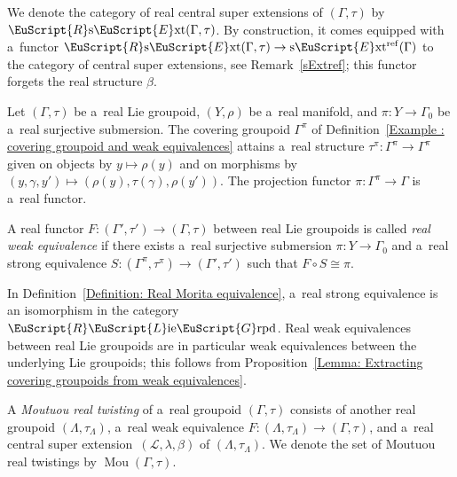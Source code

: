 \documentclass[pdftex]{sigma}
\numberwithin{equation}{section}
\def\mathscr#1{\EuScript{#1}}
\def\liegrpd{\mathscr{L}\text{ie}\mathscr{G}\text{rpd}}
\def\sExt{\normalfont\text{s}\mathscr{E}\text{xt}}
\def\RsExt{\normalfont\mathscr{R}\text{s}\mathscr{E}\text{xt}}
\def\Mou{\operatorname{Mou}}
\def\Rliegrpd{\normalfont\mathscr{R}\liegrpd}
\begin{document}
We denote the category of real central super extensions of $(\Gamma,\tau)$ by $\RsExt(\Gamma,\tau)$.
By construction, it comes equipped with a~functor
$
\RsExt(\Gamma,\tau) \to \sExt^{\mathrm{ref}}(\Gamma)
$
to the category of central super extensions, see Remark~\ref{sExtref}; this functor forgets the real structure $\beta$.

Let $(\Gamma,\tau)$ be a~real Lie groupoid, $(Y,\rho)$ be a~real manifold, and $\pi \colon Y \to \Gamma_0$ be a~real surjective submersion. The covering groupoid $\Gamma^\pi$
of Definition~\ref{Example : covering groupoid and weak equivalences} attains a~real structure $\tau^\pi \colon \Gamma^\pi \to \Gamma^\pi$ given on objects by
$y \mapsto \rho(y)$ and on morphisms by $(y,\gamma,y') \mapsto (\rho(y),\tau(\gamma),\rho(y'))$. The projection functor $\pi \colon \Gamma^\pi \to \Gamma$ is a~real functor.

\begin{Definition} \label{Definition: Real Morita equivalence}
 A real functor $F\colon (\Gamma',\tau') \to (\Gamma,\tau)$ between real Lie groupoids is called \emph{real weak equivalence} if there exists a~real surjective
 submersion $\pi \colon Y \to \Gamma_0$ and a~real strong equivalence $S \colon (\Gamma^\pi,\tau^\pi) \to (\Gamma',\tau')$ such that $F \circ S \cong \pi$.
\end{Definition}

\begin{Remark}\label{Real weak equivalences have underlying weak equivalences}
In Definition~\ref{Definition: Real Morita equivalence}, a~real strong equivalence is an isomorphism in the category~$\Rliegrpd$.
 Real weak equivalences between real Lie groupoids are in particular weak equivalences between the underlying Lie groupoids; this follows
 from Proposition~\ref{Lemma: Extracting covering groupoids from weak equivalences}.
\end{Remark}

\begin{Definition}
\label{Moutuou-Real-twisting}
 A \emph{Moutuou real twisting} of a~real groupoid $(\Gamma,\tau)$ consists of another real groupoid $(\Lambda,\tau_{\Lambda})$, a~real weak equivalence
 $F\colon (\Lambda,\tau_{\Lambda}) \to (\Gamma,\tau)$, and a~real central super extension~${(\mathcal{L},\lambda,\beta)}$ of $(\Lambda,\tau_{\Lambda})$. We denote
 the set of Moutuou real twistings by $\Mou(\Gamma,\tau)$.
\end{Definition}
\end{document}
